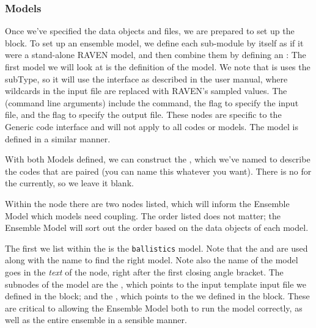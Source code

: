 \subsubsection{Models}
Once we've specified the data objects and files, we are prepared to set up the  block.  To set
up an ensemble model, we define each sub-module by itself as if it were a stand-alone RAVEN model, and then
combine them by defining an :
The first model we will look at is the definition of the  model.  We note that is uses
the  subType, so it will use the interface as described in the user manual, where
wildcards in the input file are replaced with RAVEN's sampled values.  The  (command line
arguments) include the  command, the  flag to specify the input file, and the
 flag to specify the output file.  These nodes are specific to the Generic code interface and
will not apply to all codes or models. The  model is defined in a similar manner.

With both Models defined, we can construct the , which we've named
 to describe the codes that are paired (you can name this whatever you
want).  There is no  for the  currently, so we leave it blank.

Within the  node there are two  nodes listed, which will inform the
Ensemble Model which models need coupling.  The order listed does not matter; the Ensemble Model will sort out
the order based on the  data objects of each model.

The first  we list within the  is the \texttt{ballistics} model.  Note
that the  and  are used along with the name to find the right model.  Note also
the name of the model goes in the \emph{text} of the  node, right after the first closing angle
bracket.  The subnodes of the  model are the , which points to the input
template input file we defined in the  block; and the , which points
to the  we defined in the  block.  These are critical to allowing the
Ensemble Model both to run the  model correctly, as well as the entire ensemble in a
sensible manner.

